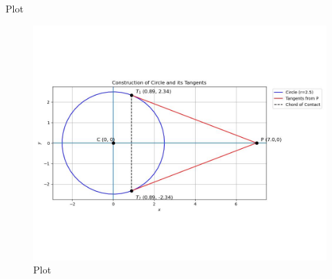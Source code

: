 \documentclass{beamer}
\begin{document}
\begin{frame}{Plot}
\begin{figure}
    \centering
    \includegraphics[width=0.5\columnwidth]{../figs/plot_c.jpg}
    \caption{Plot}
    \label{fig:fig}
\end{figure}
\end{frame}
\end{document}
